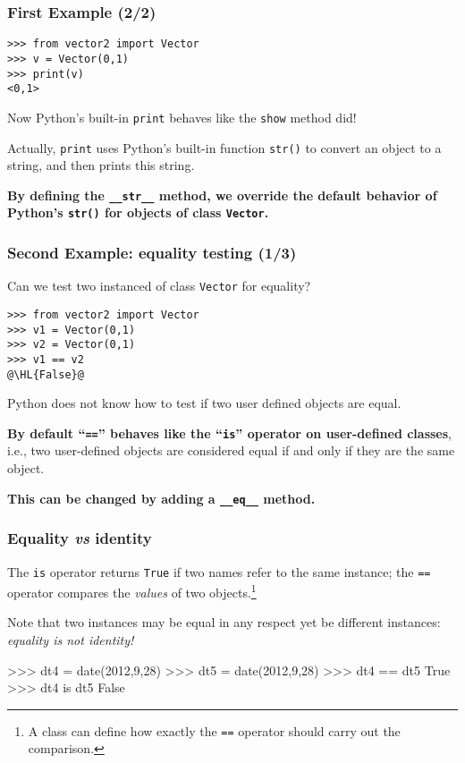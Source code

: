 \documentclass[english,serif,mathserif,xcolor=pdftex,dvipsnames,table]{beamer}
\begin{document}
\begin{frame}[fragile]
  \frametitle{First Example (2/2)}
\begin{lstlisting}
>>> from vector2 import Vector
>>> v = Vector(0,1)
>>> print(v)
<0,1>
\end{lstlisting}

  \+
  Now Python's built-in \texttt{print} behaves like the \texttt{show} method did!

  \+ Actually, \texttt{print} uses Python's built-in function
  \texttt{str()} to convert an object to a string, and then prints
  this string.

  \+ {\bfseries By defining the \lstinline|__str__| method, we
    override the default behavior of Python's \lstinline|str()| for
    objects of class \texttt{Vector}.}
\end{frame}


\begin{frame}[fragile]
  \frametitle{Second Example: equality testing (1/3)}

  Can we test two instanced of class \texttt{Vector} for equality?
\begin{lstlisting}
>>> from vector2 import Vector
>>> v1 = Vector(0,1)
>>> v2 = Vector(0,1)
>>> v1 == v2
@\HL{False}@
\end{lstlisting}

  \+ Python does not know how to test if two user defined objects are
  equal.

  \+ \textbf{By default ``\texttt{==}'' behaves like the
    ``\texttt{is}'' operator on user-defined classes}, i.e., two
  user-defined objects are considered equal if and only if they are
  the same object.

  \+ \textbf{This can be changed by adding a \lstinline|__eq__| method.}
\end{frame}


\begin{frame}[fragile]
  \frametitle{Equality \emph{vs} identity}
  The \texttt{is} operator returns \texttt{True} if two names refer to
  the same instance; the \texttt{==} operator compares the
  \emph{values} of two objects.\footnote{A class can define how
    exactly the \texttt{==} operator should carry out the comparison.}

  \+
  Note that two instances may be equal in any respect yet be
  different instances: \emph{equality is not identity!}
\begin{python}
>>> dt4 = date(2012,9,28)
>>> dt5 = date(2012,9,28)
>>> dt4 == dt5
True
>>> dt4 is dt5
False
\end{python}
\end{frame}
\end{document}
